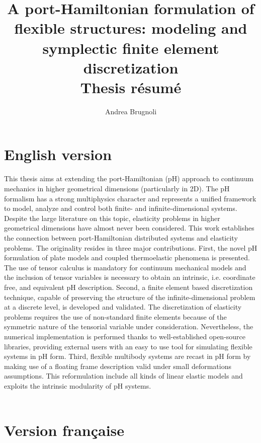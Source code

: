\documentclass{article}
\title{A port-Hamiltonian formulation of flexible structures: modeling and symplectic finite element discretization \\ \vspace{3pt}
\Large Thesis résumé}
\author{Andrea Brugnoli}
\begin{document}
\maketitle
\section*{English version}
This thesis aims at extending the port-Hamiltonian (pH) approach to continuum mechanics in higher geometrical dimensions (particularly in 2D). The pH formalism has a strong multiphysics character and represents a unified framework to model, analyze and control both finite- and infinite-dimensional systems. Despite the large literature on this topic, elasticity problems in higher geometrical dimensions have almost never been considered.  This work establishes the connection between port-Hamiltonian distributed systems and elasticity problems. The originality resides in three major contributions. First, the novel pH formulation of plate models and coupled thermoelastic phenomena is presented. The use of tensor calculus is mandatory for continuum mechanical models and the inclusion of tensor variables is necessary to obtain an intrinsic, i.e. coordinate free, and equivalent pH description. Second, a finite element based discretization technique, capable of preserving the structure of the infinite-dimensional problem at a discrete level, is developed and validated. The discretization of elasticity problems requires the use of non-standard finite elements because of the symmetric nature of the tensorial variable under consideration. Nevertheless, the numerical implementation is performed thanks to well-established open-source libraries, providing external users with an easy to use tool for simulating flexible systems in pH form. Third, flexible multibody systems are recast in pH form by making use of a floating frame description valid under small deformations assumptions. This reformulation include all kinds of linear elastic models and exploits the intrinsic modularity of pH systems.   \\\\

\section*{Version française}
\end{document}
